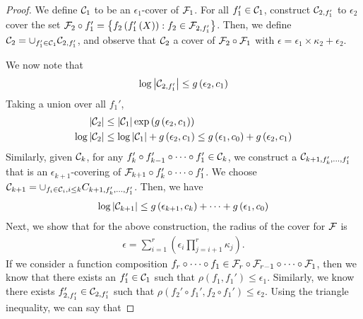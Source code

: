 \begin{proof}
We define $\mathcal C_1$ to be an $\epsilon_1$-cover of $\mathcal F_1$. For all $f_1' \in \mathcal C_1$, construct $\mathcal C_{2, f_1'}$ to $\epsilon_2$ cover the set $\mathcal F_2 \circ f_1' = \left\{f_2\left(f_1'\left(X\right)\right) : f_2 \in \mathcal F_{2,f_1'} \right\}$. Then, we define $\mathcal C_2 = \cup_{f_1'\in \mathcal C_1}\mathcal C_{2,f_1'}$, and observe that $\mathcal C_2$ a cover of $\mathcal F_2 \circ \mathcal F_1$ with $\epsilon = \epsilon_1 \times \kappa_2 + \epsilon_2$.

We now note that
\begin{align}
    \log \left\lvert\mathcal C_{2, f_1'}\right\rvert \leq g\left(\epsilon_2, c_1\right)
\end{align}
Taking a union over all $f_1'$, 
\begin{align}
    \left\lvert\mathcal C_{2}\right\rvert &\leq \left\lvert\mathcal C_{1}\right\rvert \exp\left(g\left(\epsilon_2, c_1\right)\right) \\
    \log\left\lvert\mathcal C_{2}\right\rvert &\leq \log\left\lvert\mathcal C_{1}\right\rvert + g\left(\epsilon_2, c_1\right) \leq g\left(\epsilon_1, c_0\right) + g\left(\epsilon_2, c_1\right)
\end{align}
Similarly, given $\mathcal C_k$, for any $f_k' \circ f_{k-1}' \circ \cdots \circ f_1' \in \mathcal C_k$, we construct a $\mathcal C_{k+1, f_k', \dots, f_1'}$ that is an $\epsilon_{k+1}$-covering of $\mathcal F_{k+1} \circ f_k' \circ \cdots \circ f_1'$. We choose $\mathcal C_{k+1} = \cup_{f_i \in \mathcal C_i, i \leq k} C_{k+1, f_k', \dots, f_1'}$. Then, we have
\begin{align}
    \log \left\lvert\mathcal C_{k+1}\right\rvert \leq g\left(\epsilon_{k+1}, c_k\right) + \cdots + g\left(\epsilon_1, c_0\right)
\end{align}
Next, we show that for the above construction, the radius of the cover for $\mathcal F$ is
\begin{align}
    \epsilon = \sum_{i=1}^{r} \left(\epsilon_i \prod_{j=i+1}^{r}\kappa_{j}\right).
\end{align}
If we consider a function composition $f_r \circ \cdots \circ f_1 \in \mathcal F_r \circ \mathcal F_{r-1} \circ \cdots \circ \mathcal F_1$, then we know that there exists an $f_1' \in \mathcal C_1$ such that $\rho\left(f_1, f_1'\right) \leq \epsilon_1$. Similarly, we know there exists $f_{2, f_1'}' \in \mathcal C_{2, f_1'}$ such that $\rho\left(f_2' \circ f_1', f_2\circ f_1' \right) \leq \epsilon_2$. Using the triangle inequality, we can say that 

\end{proof}
